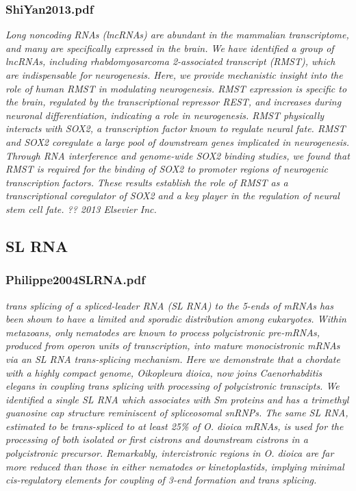 \documentclass[graybox]{svmult}
\begin{document}
\subsubsection{ShiYan2013.pdf}
\cite{Ng2013}
\textit{Long noncoding RNAs (lncRNAs) are abundant in the mammalian transcriptome, and many are specifically expressed in the brain. We have identified a group of lncRNAs, including rhabdomyosarcoma 2-associated transcript (RMST), which are indispensable for neurogenesis. Here, we provide mechanistic insight into the role of human RMST in modulating neurogenesis. RMST expression is specific to the brain, regulated by the transcriptional repressor REST, and increases during neuronal differentiation, indicating a role in neurogenesis. RMST physically interacts with SOX2, a transcription factor known to regulate neural fate. RMST and SOX2 coregulate a large pool of downstream genes implicated in neurogenesis. Through RNA interference and genome-wide SOX2 binding studies, we found that RMST is required for the binding of SOX2 to promoter regions of neurogenic transcription factors. These results establish the role of RMST as a transcriptional coregulator of SOX2 and a key player in the regulation of neural stem cell fate. ?? 2013 Elsevier Inc.}

\subsection{SL RNA}
\subsubsection{Philippe2004SLRNA.pdf}
\cite{Ganot2004}
\textit{trans splicing of a spliced-leader RNA (SL RNA) to the 5-ends of mRNAs has been shown to have a limited
and sporadic distribution among eukaryotes. Within metazoans, only nematodes are known to process polycistronic
pre-mRNAs, produced from operon units of transcription, into mature monocistronic mRNAs via an
SL RNA trans-splicing mechanism. Here we demonstrate that a chordate with a highly compact genome,
Oikopleura dioica, now joins Caenorhabditis elegans in coupling trans splicing with processing of polycistronic
transcipts. We identified a single SL RNA which associates with Sm proteins and has a trimethyl guanosine
cap structure reminiscent of spliceosomal snRNPs. The same SL RNA, estimated to be trans-spliced to at least
25\% of O. dioica mRNAs, is used for the processing of both isolated or first cistrons and downstream cistrons
in a polycistronic precursor. Remarkably, intercistronic regions in O. dioica are far more reduced than those
in either nematodes or kinetoplastids, implying minimal cis-regulatory elements for coupling of 3-end formation
and trans splicing.}
\end{document}
